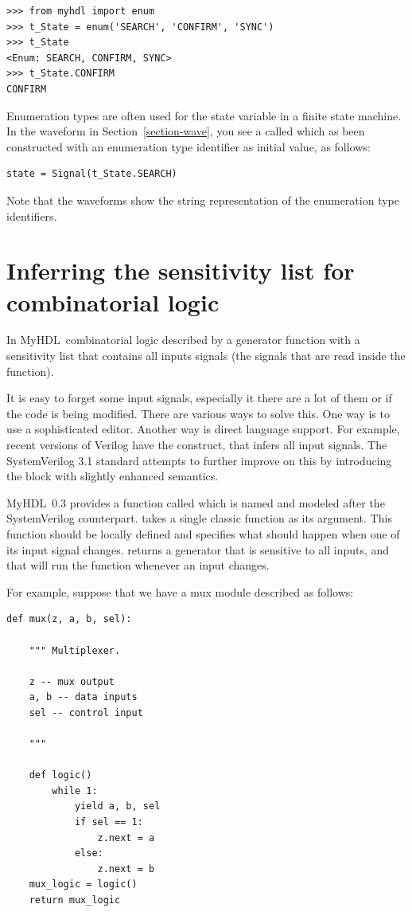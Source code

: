 \documentclass{howto}
\newcommand{\myhdl}{\protect \mbox{MyHDL}}
\begin{document}
\begin{verbatim}
>>> from myhdl import enum
>>> t_State = enum('SEARCH', 'CONFIRM', 'SYNC')
>>> t_State
<Enum: SEARCH, CONFIRM, SYNC>
>>> t_State.CONFIRM
CONFIRM
\end{verbatim}

Enumeration types are often used for the state variable in a finite
state machine.  In the waveform in Section~\ref{section-wave}, you see
a  called  which as been constructed with an
enumeration type identifier as initial value, as follows:

\begin{verbatim}
state = Signal(t_State.SEARCH)
\end{verbatim}

Note that the waveforms show the string representation of the
enumeration type identifiers. 


\section{Inferring the sensitivity list for combinatorial
logic\label{section-combinatorial}}

In \myhdl\, combinatorial logic described by a generator function with
a sensitivity list that contains all inputs signals (the signals that
are read inside the function).

It is easy to forget some input signals, especially it there are a lot
of them or if the code is being modified. There are various ways to
solve this. One way is to use a sophisticated editor. Another way is
direct language support. For example, recent versions of Verilog have
the  construct, that infers all input signals. The
SystemVerilog 3.1 standard attempts to further improve on this by
introducing the  block with slightly enhanced
semantics.

\myhdl\ 0.3 provides a function called  which
is named and modeled after the SystemVerilog counterpart.
 takes a single classic function as its
argument. This function should be locally defined and specifies what
should happen when one of its input signal
changes.  returns a generator that is
sensitive to all inputs, and that will run the function whenever an
input changes.

For example, suppose that we have a mux module described as follows:

\begin{verbatim}
def mux(z, a, b, sel):

    """ Multiplexer.
    
    z -- mux output
    a, b -- data inputs
    sel -- control input

    """

    def logic()
        while 1:
            yield a, b, sel
            if sel == 1:
                z.next = a
            else:
                z.next = b
    mux_logic = logic()
    return mux_logic
\end{verbatim}
\end{document}
